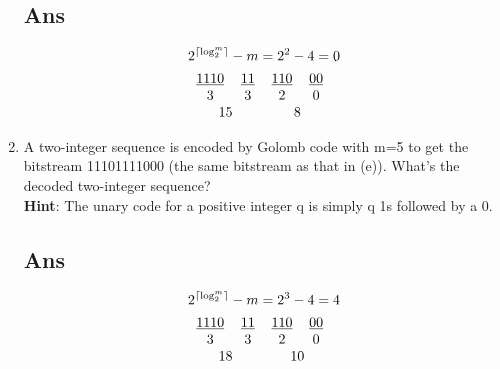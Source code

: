 \documentclass[a4paper, 11pt]{article}
\DeclarePairedDelimiter\ceil{\lceil}{\rceil}
\begin{document}
\begin{enumerate}[label=(\alph*)]
  \subsection*{Ans}
    \begin{align*}
      &2^{\ceil*{\log_2^{m}}}-m=2^{2}-4 = 0 \\
      &\begin{tabular}{ cccc } 
        \underline{1110} & \underline{11} & \underline{110} & \underline{00} \\
        3                & 3              & 2               & 0 \\
      \multicolumn{2}{c}{15} & \multicolumn{2}{c}{8}
      \end{tabular} \\
    \end{align*}
  \newpage
  \item A two-integer sequence is encoded by Golomb code with m=5 to get the bitstream
  11101111000 (the same bitstream as that in (e)). What’s the decoded two-integer sequence?\\
  \textbf{Hint}: The unary code for a positive integer q is simply q 1s followed by a 0.
  \subsection*{Ans}
  \begin{align*}
    &2^{\ceil*{\log_2^{m}}}-m=2^{3}-4 = 4 \\
    &\begin{tabular}{ cccc } 
     \underline{1110} & \underline{11} & \underline{110} & \underline{00} \\
     3                & 3              & 2               & 0 \\
    \multicolumn{2}{c}{18} & \multicolumn{2}{c}{10}
    \end{tabular} \\
  \end{align*}
\end{enumerate}
\end{document}
